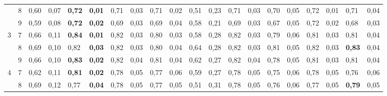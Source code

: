 \documentclass[conference]{IEEEtran}
\begin{document}
\begin{table}[]
\begin{tabular}{|cl|ll|ll|ll|ll|ll|ll|ll|ll|ll|}
		\multicolumn{1}{|c|}{} & 8 & \multicolumn{1}{l|}{0,60} & 0,07 & \multicolumn{1}{l|}{\textbf{0,72}} & \textbf{0,01} & \multicolumn{1}{l|}{0,71} & 0,03 & \multicolumn{1}{l|}{0,71} & 0,02 & \multicolumn{1}{l|}{0,51} & 0,23 & \multicolumn{1}{l|}{0,71} & 0,03 & \multicolumn{1}{l|}{0,70} & 0,05 & \multicolumn{1}{l|}{0,72} & 0,01 & \multicolumn{1}{l|}{0,71} & 0,04 \\ \cline{2-20} 
		\multicolumn{1}{|c|}{} & 9 & \multicolumn{1}{l|}{0,59} & 0,08 & \multicolumn{1}{l|}{\textbf{0,72}} & \textbf{0,02} & \multicolumn{1}{l|}{0,69} & 0,03 & \multicolumn{1}{l|}{0,69} & 0,04 & \multicolumn{1}{l|}{0,58} & 0,21 & \multicolumn{1}{l|}{0,69} & 0,03 & \multicolumn{1}{l|}{0,67} & 0,05 & \multicolumn{1}{l|}{0,72} & 0,02 & \multicolumn{1}{l|}{0,68} & 0,03 \\ \hline
		\multicolumn{1}{|c|}{\multirow{3}{*}{3}} & 7 & \multicolumn{1}{l|}{0,66} & 0,11 & \multicolumn{1}{l|}{\textbf{0,84}} & \textbf{0,01} & \multicolumn{1}{l|}{0,82} & 0,03 & \multicolumn{1}{l|}{0,80} & 0,03 & \multicolumn{1}{l|}{0,58} & 0,28 & \multicolumn{1}{l|}{0,82} & 0,03 & \multicolumn{1}{l|}{0,79} & 0,06 & \multicolumn{1}{l|}{0,81} & 0,03 & \multicolumn{1}{l|}{0,81} & 0,04 \\ \cline{2-20} 
		\multicolumn{1}{|c|}{} & 8 & \multicolumn{1}{l|}{0,69} & 0,10 & \multicolumn{1}{l|}{0,82} & \textbf{0,03} & \multicolumn{1}{l|}{0,82} & 0,03 & \multicolumn{1}{l|}{0,80} & 0,04 & \multicolumn{1}{l|}{0,64} & 0,28 & \multicolumn{1}{l|}{0,82} & 0,03 & \multicolumn{1}{l|}{0,81} & 0,05 & \multicolumn{1}{l|}{0,82} & 0,03 & \multicolumn{1}{l|}{\textbf{0,83}} & 0,04 \\ \cline{2-20} 
		\multicolumn{1}{|c|}{} & 9 & \multicolumn{1}{l|}{0,66} & 0,10 & \multicolumn{1}{l|}{\textbf{0,83}} & \textbf{0,02} & \multicolumn{1}{l|}{0,82} & 0,04 & \multicolumn{1}{l|}{0,81} & 0,04 & \multicolumn{1}{l|}{0,62} & 0,27 & \multicolumn{1}{l|}{0,82} & 0,04 & \multicolumn{1}{l|}{0,78} & 0,05 & \multicolumn{1}{l|}{0,81} & 0,03 & \multicolumn{1}{l|}{0,81} & 0,04 \\ \hline
		\multicolumn{1}{|c|}{\multirow{3}{*}{4}} & 7 & \multicolumn{1}{l|}{0,62} & 0,11 & \multicolumn{1}{l|}{\textbf{0,81}} & \textbf{0,02} & \multicolumn{1}{l|}{0,78} & 0,05 & \multicolumn{1}{l|}{0,77} & 0,06 & \multicolumn{1}{l|}{0,59} & 0,27 & \multicolumn{1}{l|}{0,78} & 0,05 & \multicolumn{1}{l|}{0,75} & 0,06 & \multicolumn{1}{l|}{0,78} & 0,05 & \multicolumn{1}{l|}{0,76} & 0,06 \\ \cline{2-20} 
		\multicolumn{1}{|c|}{} & 8 & \multicolumn{1}{l|}{0,69} & 0,12 & \multicolumn{1}{l|}{0,77} & \textbf{0,04} & \multicolumn{1}{l|}{0,78} & 0,05 & \multicolumn{1}{l|}{0,77} & 0,05 & \multicolumn{1}{l|}{0,51} & 0,31 & \multicolumn{1}{l|}{0,78} & 0,05 & \multicolumn{1}{l|}{0,76} & 0,06 & \multicolumn{1}{l|}{0,77} & 0,05 & \multicolumn{1}{l|}{\textbf{0,79}} & 0,05 \\ \cline{2-20} 

\end{tabular}
\end{table}
\end{document}
